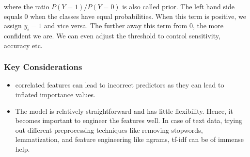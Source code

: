 \documentclass[../statistical_learning_notes.tex]{subfiles}
\begin{document}
where the ratio $P(Y=1)/P(Y=0)$ is also called prior. The left hand side equals $0$ when the classes have equal probabilities. When this term is positive, we assign $y_{i}=1$ and vice versa. The further away this term from $0$, the more confident we are. We can even adjust the threshold to control sensitivity, accuracy etc.\newline

\subsubsection*{Key Considerations}
\begin{itemize}
    \item correlated features can lead to incorrect predictors as they can lead to inflated importance values.
    \item The model is relatively straightforward and has little flexibility. Hence, it becomes important to engineer the features well. In case of text data, trying out different preprocessing techniques like removing stopwords, lemmatization, and feature engineering like ngrams, tf-idf can be of immense help.
\end{itemize}
\end{document}

